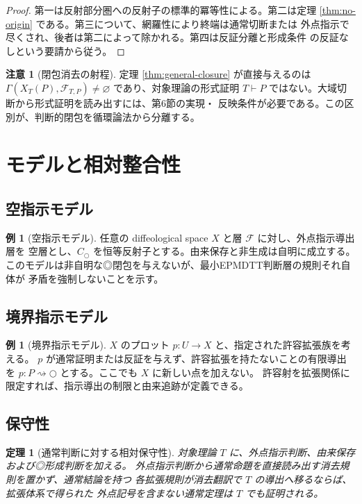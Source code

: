 \documentclass[a4paper,11pt]{ltjsarticle}
\theoremstyle{definition}
\newtheorem{remark}[definition]{注意}
\newtheorem{example}[definition]{例}
\theoremstyle{plain}
\newtheorem{theorem}[definition]{定理}
\newcommand{\dfix}{\mathord{\text{○}}}
\newcommand{\1}{\mathbf{1}}
\begin{document}
\begin{proof}
第一は反射部分圏への反射子の標準的冪等性による。第二は定理
\ref{thm:no-origin} である。第三について、網羅性により終端は通常切断または
外点指示で尽くされ、後者は第二によって除かれる。第四は反証分離と形成条件
の反証なしという要請から従う。
\end{proof}

\begin{remark}[閉包消去の射程]
定理 \ref{thm:general-closure} が直接与えるのは
$\Gamma(X_T(P),\mathcal F_{T,P})\ne\varnothing$ であり、対象理論の形式証明
$T\vdash P$ ではない。大域切断から形式証明を読み出すには、第6節の実現・
反映条件が必要である。この区別が、判断的閉包を循環論法から分離する。
\end{remark}

\section{モデルと相対整合性}

\subsection{空指示モデル}

\begin{example}[空指示モデル]
任意の diffeological space $X$ と層 $\mathcal F$ に対し、外点指示導出層を
空層とし、$C_{\dfix}$ を恒等反射子とする。由来保存と非生成は自明に成立する。
このモデルは非自明な◎閉包を与えないが、最小EPMDTT判断層の規則それ自体が
矛盾を強制しないことを示す。
\end{example}

\subsection{境界指示モデル}

\begin{example}[境界指示モデル]
$X$ のプロット $p:U\to X$ と、指定された許容拡張族を考える。
$p$ が通常証明または反証を与えず、許容拡張を持たないことの有限導出を
$p:P\rightsquigarrow\dfix$ とする。ここでも $X$ に新しい点を加えない。
許容射を拡張関係に限定すれば、指示導出の制限と由来追跡が定義できる。
\end{example}

\subsection{保守性}

\begin{theorem}[通常判断に対する相対保守性]\label{thm:conservative}
対象理論 $T$ に、外点指示判断、由来保存および◎形成判断を加える。
外点指示判断から通常命題を直接読み出す消去規則を置かず、通常結論を持つ
各拡張規則が消去翻訳で $T$ の導出へ移るならば、拡張体系で得られた
外点記号を含まない通常定理は $T$ でも証明される。
\end{theorem}
\end{document}
